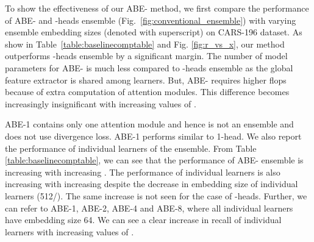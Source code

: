 \documentclass[runningheads]{llncs}
\begin{document}
To show the effectiveness of our ABE- method, we first compare the performance of ABE- and -heads ensemble (Fig.~\ref{fig:conventional_ensemble}) with varying ensemble embedding sizes (denoted with superscript) on CARS-196 dataset.
As show in Table~\ref{table:baselinecomptable} and Fig. \ref{fig:r_vs_x},
our method outperforms -heads ensemble by a significant margin.
The number of model parameters for ABE- is much less compared to -heads ensemble as the global feature extractor  is shared among learners.
But, ABE- requires higher flops because of extra computation of attention modules. This difference becomes increasingly insignificant with increasing values of .

ABE-1 contains only one attention module and hence is not an ensemble and does not use divergence loss.
ABE-1 performs similar to 1-head.
We also report the performance of individual learners of the ensemble.
From Table \ref{table:baselinecomptable}, we can see that the performance of ABE- ensemble is increasing with increasing .
The performance of individual learners is also increasing with increasing  despite the decrease in embedding size of individual learners (512/).
The same increase is not seen for the case of -heads.
Further, we can refer to ABE-1, ABE-2, ABE-4 and ABE-8, where all individual learners have embedding size 64.
We can see a clear increase in recall of individual learners with increasing values of .
\end{document}
